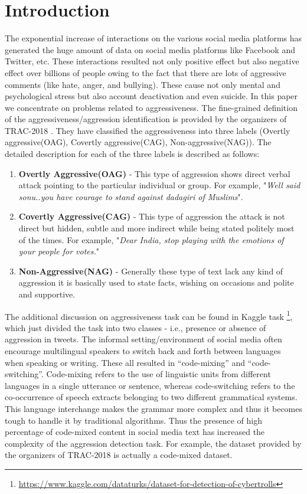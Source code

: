 \documentclass[sigconf]{acmart}
\begin{document}
\raggedbottom

\section{Introduction}
The exponential increase of interactions on the various social media platforms has generated the huge amount of data on social media platforms like Facebook and Twitter, etc. These interactions resulted not only positive effect but also negative effect over billions of people owing to the fact that there are lots of aggressive comments (like hate, anger, and bullying). These cause not only mental and psychological stress but also account deactivation and even suicide\cite{hinduja2010bullying}. In this paper we concentrate on problems related to aggressiveness.
\newline The fine-grained definition of the aggressiveness/aggression identification is provided by the organizers of TRAC-2018 \cite{kumar2018aggression, kumar2018trac}. They have classified the aggressiveness into three labels (Overtly aggressive(OAG), Covertly aggressive(CAG), Non-aggressive(NAG)). The detailed description for each of the three labels is described as follows:
\begin{enumerate}
\item \textbf{Overtly Aggressive(OAG)} - This type of aggression shows direct verbal attack pointing to the particular individual or group. For example, "\textit{Well said sonu..you have courage to stand against dadagiri of Muslims}".
\item \textbf{Covertly Aggressive(CAG)} - This type of aggression the attack is not direct but hidden, subtle and more indirect while being stated politely most of the times. For example, "\textit{Dear India,  stop playing with the emotions of your people for votes.}"
\item \textbf{Non-Aggressive(NAG)} - Generally these type of text lack any kind of aggression it is basically used to state facts, wishing on occasions and polite and supportive.
\end{enumerate}
The additional discussion on aggressiveness task can be found in Kaggle task \footnote{\url{https://www.kaggle.com/dataturks/dataset-for-detection-of-cybertrolls}}, which just divided the task into two classes - i.e., presence or absence of aggression in tweets.
\newline
The informal setting/environment of social media often encourage multilingual speakers to switch back and forth between languages when speaking or writing. These all resulted in \enquote{code-mixing} and \enquote{code-switching}. Code-mixing refers to the use of linguistic units from different languages in a single utterance or sentence, whereas code-switching refers to the co-occurrence of speech extracts belonging to two different grammatical systems\cite{gumperz1982discourse}. This language interchange makes the grammar more complex and thus it becomes tough to handle it by traditional algorithms. Thus the presence of high percentage of code-mixed content in social media text has increased the complexity of the aggression detection task. For example, the dataset provided by the organizers of TRAC-2018 \cite{kumar2018aggression, kumar2018trac} is actually a code-mixed dataset.
\end{document}
